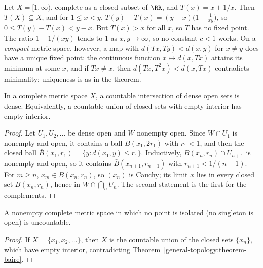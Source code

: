 \begin{counterexample}\label{general-topology:counterexample-weak-contraction}
Let $X = [1, \infty)$, complete as a closed subset of $\RR$, and $T(x) = x + 1/x$. Then $T(X) \subseteq X$, and for $1 \leq x < y$,
$T(y) - T(x) = (y - x)\bigl(1 - \frac{1}{xy}\bigr)$, so $0 \leq T(y) - T(x) < y - x$. But $T(x) > x$ for all $x$, so $T$ has no fixed point. The ratio $1 - 1/(xy)$ tends to $1$ as $x, y \to \infty$, so
no constant $c < 1$ works. On a \emph{compact} metric space, however, a map with $d(Tx, Ty) < d(x, y)$ for $x \neq y$ does have a unique fixed point: the continuous function $x \mapsto d(x, Tx)$ attains its
minimum at some $x$, and if $Tx \neq x$, then $d(Tx, T^2x) < d(x, Tx)$ contradicts minimality; uniqueness is as in the theorem.
\end{counterexample}

\begin{theorem}\label{general-topology:theorem-baire}
In a complete metric space $X$, a countable intersection of dense open sets is dense. Equivalently, a countable union of closed sets with empty interior
has empty interior.
\end{theorem}

\begin{proof}
Let $U_1, U_2, \ldots$ be dense open and $W$ nonempty open. Since $W \cap U_1$ is nonempty and open, it contains a ball $B(x_1, 2r_1)$ with $r_1 < 1$, and
then the closed ball $\bar{B}(x_1, r_1) = \{y : d(x_1, y) \leq r_1\}$. Inductively, $B(x_n, r_n) \cap U_{n+1}$ is nonempty and open, so it contains
$\bar{B}(x_{n+1}, r_{n+1})$ with $r_{n+1} < 1/(n+1)$. For $m \geq n$, $x_m \in B(x_n, r_n)$, so $(x_n)$ is Cauchy; its limit $x$ lies in every closed set
$\bar{B}(x_n, r_n)$, hence in $W \cap \bigcap_n U_n$. The second statement is the first for the complements.
\end{proof}

\begin{corollary}\label{general-topology:corollary-baire-uncountable}
A nonempty complete metric space in which no point is isolated (no singleton is open) is uncountable.
\end{corollary}

\begin{proof}
If $X = \{x_1, x_2, \ldots\}$, then $X$ is the countable union of the closed sets $\{x_n\}$, which have empty interior, contradicting
Theorem~\ref{general-topology:theorem-baire}.
\end{proof}


